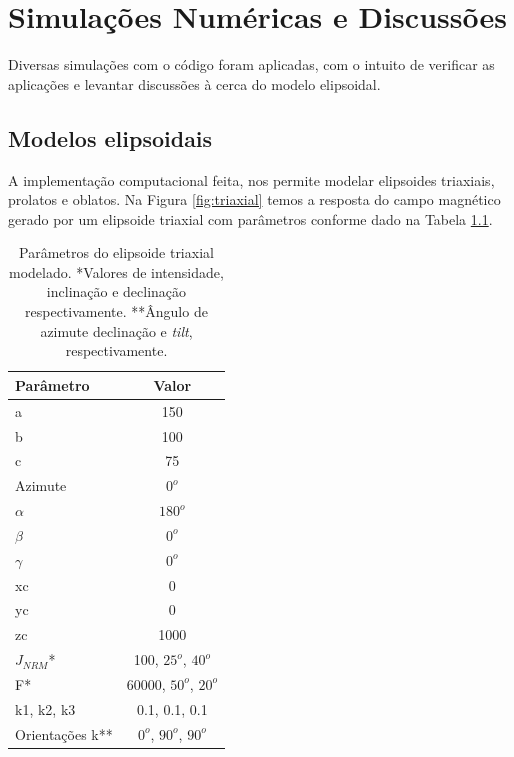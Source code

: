 \chapter{Simulações Numéricas e Discussões}

Diversas simulações com o código foram aplicadas, com o intuito de verificar as aplicações e levantar discussões
à cerca do modelo elipsoidal.

\section{Modelos elipsoidais}

A implementação computacional feita, nos permite modelar elipsoides triaxiais, prolatos e oblatos. Na Figura \ref{fig:triaxial} temos a resposta do campo magnético gerado por um elipsoide triaxial com parâmetros conforme dado na Tabela \ref{tab:triaxial}.

\begin{table}[h]
	\begin{center}
		\begin{tabular}{|l|c|}
			\hline
			\textbf{Parâmetro}  & \textbf{Valor}  \\
			\hline 
			a   & 150 \\
			\hline
			b   & 100  \\
			\hline
			c   & 75 \\
			\hline
			Azimute   & $0^o$ \\
			\hline
			$\alpha$    & $180^o$   \\
			\hline
			$\beta$    & $0^o$ \\
			\hline
			$\gamma$   & $0^o$  \\
			\hline
			xc   & 0  \\
			\hline          
			yc   & 0  \\
			\hline                
			zc   & 1000  \\
			\hline
			$J_{NRM}$*  & 100, $25^o$, $40^o$  \\
			\hline
			F*    & 60000, $50^o$, $20^o$ \\
			\hline
			k1, k2, k3   & 0.1, 0.1, 0.1  \\
			\hline
			Orientações k**   & $0^o$, $90^o$, $90^o$  \\
			\hline
		\end{tabular}
		\caption{Parâmetros do elipsoide triaxial modelado. *Valores de intensidade, inclinação e declinação respectivamente. **Ângulo de azimute
			declinação e \textit{tilt}, respectivamente.}
	\end{center}
	\label{tab:triaxial}
\end{table}

